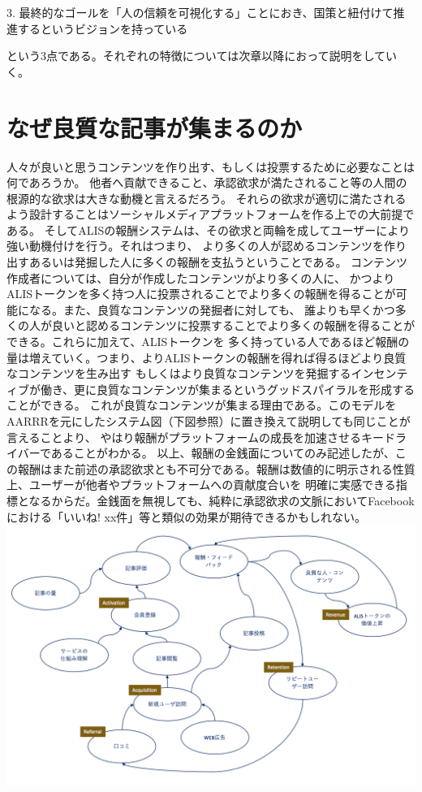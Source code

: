 \documentclass{jsarticle}
\begin{document}
3. 最終的なゴールを「人の信頼を可視化する」ことにおき、国策と紐付けて推進するというビジョンを持っている

という3点である。それぞれの特徴については次章以降におって説明をしていく。
\section{なぜ良質な記事が集まるのか}
人々が良いと思うコンテンツを作り出す、もしくは投票するために必要なことは何であろうか。  
他者へ貢献できること、承認欲求が満たされること等の人間の根源的な欲求は大きな動機と言えるだろう。
それらの欲求が適切に満たされるよう設計することはソーシャルメディアプラットフォームを作る上での大前提である。
そしてALISの報酬システムは、その欲求と両輪を成してユーザーにより強い動機付けを行う。それはつまり、
より多くの人が認めるコンテンツを作り出すあるいは発掘した人に多くの報酬を支払うということである。
コンテンツ作成者については、自分が作成したコンテンツがより多くの人に、
かつよりALISトークンを多く持つ人に投票されることでより多くの報酬を得ることが可能になる。また、良質なコンテンツの発掘者に対しても、
誰よりも早くかつ多くの人が良いと認めるコンテンツに投票することでより多くの報酬を得ることができる。これらに加えて、ALISトークンを
多く持っている人であるほど報酬の量は増えていく。つまり、よりALISトークンの報酬を得れば得るほどより良質なコンテンツを生み出す
もしくはより良質なコンテンツを発掘するインセンティブが働き、更に良質なコンテンツが集まるというグッドスパイラルを形成することができる。
これが良質なコンテンツが集まる理由である。このモデルをAARRRを元にしたシステム図（下図参照）に置き換えて説明しても同じことが言えることより、
やはり報酬がプラットフォームの成長を加速させるキードライバーであることがわかる。
以上、報酬の金銭面についてのみ記述したが、この報酬はまた前述の承認欲求とも不可分である。報酬は数値的に明示される性質上、ユーザーが他者やプラットフォームへの貢献度合いを
明確に実感できる指標となるからだ。金銭面を無視しても、純粋に承認欲求の文脈においてFacebookにおける「いいね! xx件」等と類似の効果が期待できるかもしれない。
	\includegraphics[scale=0.6]{img/systemthinking-with-AARRR.png}
\end{document}
